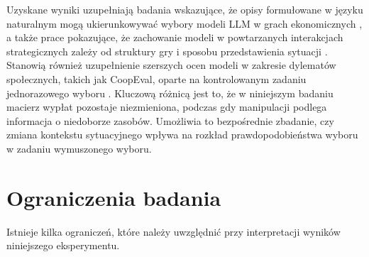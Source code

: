 \documentclass[11pt]{article}
\begin{document}
Uzyskane wyniki uzupełniają badania wskazujące, że opisy formułowane w języku naturalnym mogą ukierunkowywać wybory modeli LLM w grach ekonomicznych \citep{phelps2025machine}, a także prace pokazujące, że zachowanie modeli w powtarzanych interakcjach strategicznych zależy od struktury gry i sposobu przedstawienia sytuacji \citep{akata2025repeated,pal2026robust}. Stanowią również uzupełnienie szerszych ocen modeli w zakresie dylematów społecznych, takich jak CoopEval, oparte na kontrolowanym zadaniu jednorazowego wyboru \citep{tewolde2026coopeval}. Kluczową różnicą jest to, że w niniejszym badaniu macierz wypłat pozostaje niezmieniona, podczas gdy manipulacji podlega informacja o niedoborze zasobów. Umożliwia to bezpośrednie zbadanie, czy zmiana kontekstu sytuacyjnego wpływa na rozkład prawdopodobieństwa wyboru w zadaniu wymuszonego wyboru.

\section{Ograniczenia badania}\label{sec:limits}

Istnieje kilka ograniczeń, które należy uwzględnić przy interpretacji wyników niniejszego eksperymentu.
\end{document}
